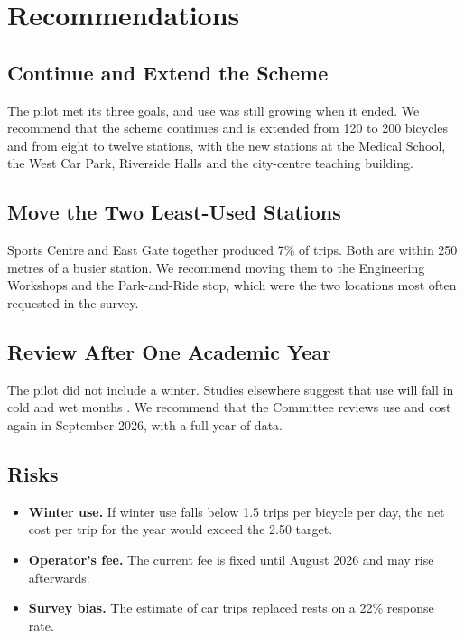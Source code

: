 \chapter{Recommendations}\label{ch:recommendations}

\section{Continue and Extend the Scheme}
The pilot met its three goals, and use was still growing when it ended. We recommend that the scheme continues and is extended from 120 to 200 bicycles and from eight to twelve stations, with the new stations at the Medical School, the West Car Park, Riverside Halls and the city-centre teaching building.

\section{Move the Two Least-Used Stations}
Sports Centre and East Gate together produced 7\% of trips. Both are within 250 metres of a busier station. We recommend moving them to the Engineering Workshops and the Park-and-Ride stop, which were the two locations most often requested in the survey.

\section{Review After One Academic Year}
The pilot did not include a winter. Studies elsewhere suggest that use will fall in cold and wet months \cite{gebhart2014impact}. We recommend that the Committee reviews use and cost again in September 2026, with a full year of data.

\section{Risks}
\begin{itemize}
  \item \textbf{Winter use.} If winter use falls below 1.5 trips per bicycle per day, the net cost per trip for the year would exceed the 2.50 target.
  \item \textbf{Operator's fee.} The current fee is fixed until August 2026 and may rise afterwards.
  \item \textbf{Survey bias.} The estimate of car trips replaced rests on a 22\% response rate.
\end{itemize}
